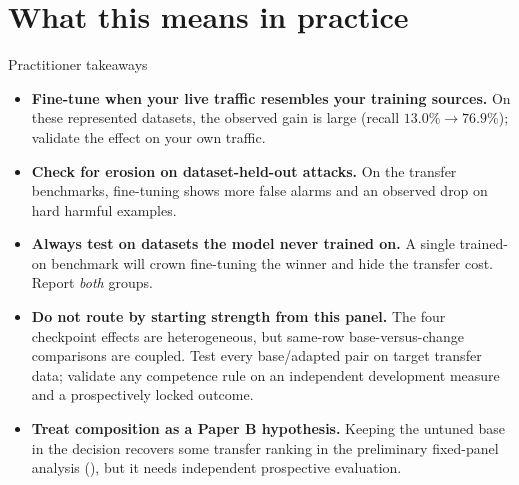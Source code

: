 \documentclass[11pt]{article}
\begin{document}
\section{What this means in practice}
\begin{takeaway}{Practitioner takeaways}
\small
\begin{itemize}
\item \textbf{Fine-tune when your live traffic resembles your training sources.}
On these represented datasets, the observed gain is large (recall $13.0\%\!\to\!76.9\%$); validate
the effect on your own traffic.
\item \textbf{Check for erosion on dataset-held-out attacks.} On the transfer benchmarks,
fine-tuning shows more false alarms and an observed drop on hard harmful examples.
\item \textbf{Always test on datasets the model never trained on.} A single trained-on
benchmark will crown fine-tuning the winner and hide the transfer cost. Report \emph{both}
groups.
\item \textbf{Do not route by starting strength from this panel.} The four checkpoint effects are
heterogeneous, but same-row base-versus-change comparisons are coupled. Test every base/adapted
pair on target transfer data; validate any competence rule on an independent development measure
and a prospectively locked outcome.
\item \textbf{Treat composition as a Paper B hypothesis.} Keeping the untuned base in the
decision recovers some transfer ranking in the preliminary fixed-panel analysis
(), but it needs independent prospective evaluation.
\end{itemize}
\end{takeaway}

\end{document}
